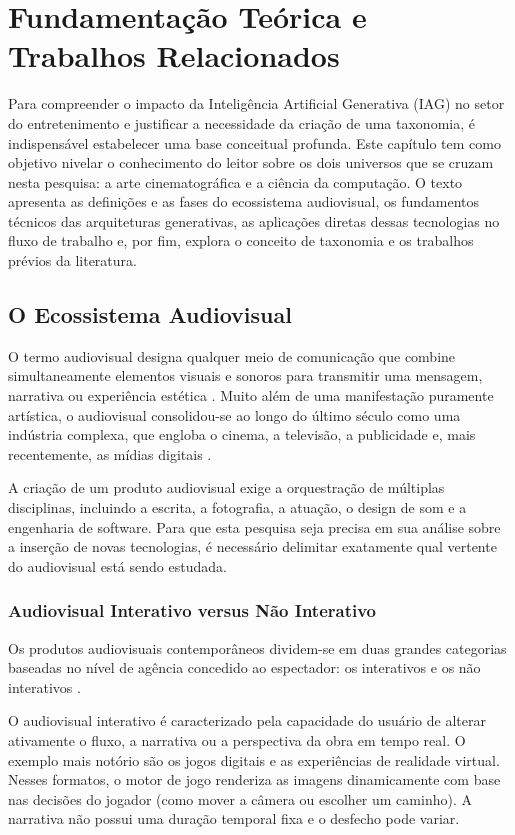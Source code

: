 \chapter{Fundamentação Teórica e Trabalhos Relacionados}
\label{cap:conceitos}

Para compreender o impacto da Inteligência Artificial Generativa (IAG) no setor do entretenimento e justificar a necessidade da criação de uma taxonomia, é indispensável estabelecer uma base conceitual profunda. Este capítulo tem como objetivo nivelar o conhecimento do leitor sobre os dois universos que se cruzam nesta pesquisa: a arte cinematográfica e a ciência da computação. O texto apresenta as definições e as fases do ecossistema audiovisual, os fundamentos técnicos das arquiteturas generativas, as aplicações diretas dessas tecnologias no fluxo de trabalho e, por fim, explora o conceito de taxonomia e os trabalhos prévios da literatura.

\section{O Ecossistema Audiovisual}

O termo audiovisual designa qualquer meio de comunicação que combine simultaneamente elementos visuais e sonoros para transmitir uma mensagem, narrativa ou experiência estética \citep{chion2019audiovision}. Muito além de uma manifestação puramente artística, o audiovisual consolidou-se ao longo do último século como uma indústria complexa, que engloba o cinema, a televisão, a publicidade e, mais recentemente, as mídias digitais \citep{voinea2025}.

A criação de um produto audiovisual exige a orquestração de múltiplas disciplinas, incluindo a escrita, a fotografia, a atuação, o design de som e a engenharia de software. Para que esta pesquisa seja precisa em sua análise sobre a inserção de novas tecnologias, é necessário delimitar exatamente qual vertente do audiovisual está sendo estudada.

\subsection{Audiovisual Interativo versus Não Interativo}

Os produtos audiovisuais contemporâneos dividem-se em duas grandes categorias baseadas no nível de agência concedido ao espectador: os interativos e os não interativos \citep{lazarte2025}.

O audiovisual interativo é caracterizado pela capacidade do usuário de alterar ativamente o fluxo, a narrativa ou a perspectiva da obra em tempo real. O exemplo mais notório são os jogos digitais e as experiências de realidade virtual. Nesses formatos, o motor de jogo renderiza as imagens dinamicamente com base nas decisões do jogador (como mover a câmera ou escolher um caminho). A narrativa não possui uma duração temporal fixa e o desfecho pode variar.

